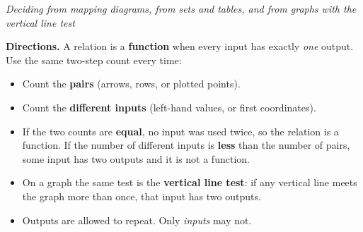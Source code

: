 \documentclass[12pt]{article}
\begin{document}

\begin{center}
\textit{Deciding from mapping diagrams, from sets and tables, and from graphs
with the vertical line test}
\end{center}

\noindent\textbf{Directions.} A relation is a \textbf{function} when every
input has exactly \emph{one} output. Use the same two-step count every time:
\begin{itemize}[leftmargin=1.2cm, itemsep=2pt, topsep=2pt]
\item Count the \textbf{pairs} (arrows, rows, or plotted points).
\item Count the \textbf{different inputs} (left-hand values, or first
coordinates).
\item If the two counts are \textbf{equal}, no input was used twice, so the
relation is a function. If the number of different inputs is \textbf{less} than
the number of pairs, some input has two outputs and it is not a function.
\item On a graph the same test is the \textbf{vertical line test}: if any
vertical line meets the graph more than once, that input has two outputs.
\item Outputs are allowed to repeat. Only \emph{inputs} may not.
\end{itemize}

\end{document}
